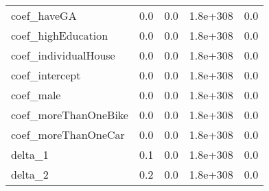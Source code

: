 \begin{tabular}{lrrrr}
coef_haveGA & 0.0 & 0.0 & 1.8e+308 & 0.0 \\
coef_highEducation & 0.0 & 0.0 & 1.8e+308 & 0.0 \\
coef_individualHouse & 0.0 & 0.0 & 1.8e+308 & 0.0 \\
coef_intercept & 0.0 & 0.0 & 1.8e+308 & 0.0 \\
coef_male & 0.0 & 0.0 & 1.8e+308 & 0.0 \\
coef_moreThanOneBike & 0.0 & 0.0 & 1.8e+308 & 0.0 \\
coef_moreThanOneCar & 0.0 & 0.0 & 1.8e+308 & 0.0 \\
delta_1 & 0.1 & 0.0 & 1.8e+308 & 0.0 \\
delta_2 & 0.2 & 0.0 & 1.8e+308 & 0.0 \\
\end{tabular}

